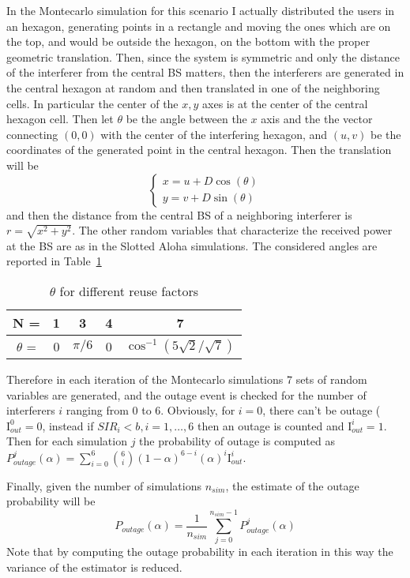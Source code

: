 \documentclass[10pt]{article}
\begin{document}
In the Montecarlo simulation for this scenario I actually distributed the users in an hexagon, generating points in a rectangle and moving the ones which are on the top, and would be outside the hexagon, on the bottom with the proper geometric translation. Then, since the system is symmetric and only the distance of the interferer from the central BS matters, then the interferers are generated in the central hexagon at random and then translated in one of the neighboring cells. In particular the center of the $x, y$ axes is at the center of the central hexagon cell. Then let $\theta$ be the angle between the $x$ axis and the the vector connecting $(0, 0)$ with the center of the interfering hexagon, and $(u, v)$ be the coordinates of the generated point in the central hexagon. Then the translation will be
\begin{equation}
  \begin{cases}
  x = u + D\cos(\theta) \\
  y = v + D\sin(\theta)
  \end{cases}
\end{equation}
and then the distance from the central BS of a neighboring interferer is $r = \sqrt{x^2 + y^2}$. The other random variables that characterize the received power at the BS are as in the Slotted Aloha simulations. The considered angles are reported in Table~\ref{table:angles}
\begin{table}[h!]
\centering
  \begin{tabular}{c|c|c|c|c}
  N = & 1 & 3 & 4 & 7 \\ \hline
  $\theta$ = & 0 & $\pi/6$ & 0 & $\cos^{-1}({5\sqrt{2}/\sqrt{7}})$
  \end{tabular}
  \caption{$\theta$ for different reuse factors}
  \label{table:angles}
\end{table}

Therefore in each iteration of the Montecarlo simulations 7 sets of random variables are generated, and the outage event is checked for the number of interferers $i$ ranging from 0 to 6. Obviously, for $i = 0$, there can't be outage ($\mathrm{I}_{out}^0 = 0$, instead if $SIR_i < b, i = 1, \dots, 6$ then an outage is counted and $\mathrm{I}_{out}^i = 1$. Then for each simulation $j$ the probability of outage is computed as $P_{outage}^j(\alpha) = \sum_{i = 0}^{6} \binom{6}{i} (1 - \alpha)^{6-i}(\alpha)^i \mathrm{I}_{out}^i$. 

Finally, given the number of simulations $n_{sim}$, the estimate of the outage probability will be
\begin{equation}
  P_{outage}(\alpha) = \frac{1}{n_{sim}} \sum_{j = 0}^{n_{sim} - 1} P_{outage}^j(\alpha)
\end{equation}
Note that by computing the outage probability in each iteration in this way the variance of the estimator is reduced. 
\end{document}
